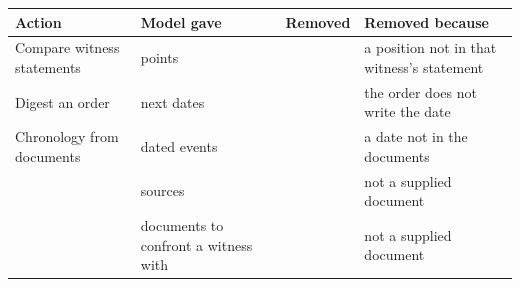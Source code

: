 \begin{tabular}{@{}>{\raggedright\arraybackslash}p{0.95in}>{\raggedright\arraybackslash}p{0.85in}>{\raggedright\arraybackslash}p{0.5in}>{\raggedright\arraybackslash}p{1.0in}@{}}
\toprule
Action & Model gave & Removed & Removed because \\
\midrule
Compare witness statements & \GroundMatrixProposed{} points & \GroundMatrixDropped{} & a position not in that witness's statement \\
Digest an order & \GroundDigestRuns{} next dates & \GroundDigestInvented{} & the order does not write the date \\
Chronology from documents & \GroundTimelineProposed{} dated events & \GroundTimelineDropped{} & a date not in the documents \\
 & \GroundSourcesNamed{} sources & \GroundSourcesInvented{} & not a supplied document \\
 & \GroundQDocsNamed{} documents to confront a witness with & \GroundQDocsInvented{} & not a supplied document \\
\bottomrule
\end{tabular}
